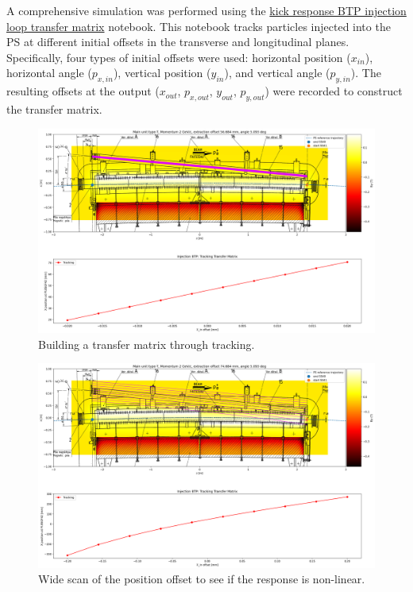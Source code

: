 A comprehensive simulation was performed using the  \href{https://gitlab.cern.ch/eljohnso/acc-models-tls-eliott-fork/-/blob/EliottBranch/ps_injection/kick_response_injection_tracking/kick_response_BTP_injection_loop_transfer_matrix.ipynb}{kick response BTP injection loop transfer matrix} notebook. This notebook tracks particles injected into the PS at different initial offsets in the transverse and longitudinal planes. Specifically, four types of initial offsets were used: horizontal position (\(x_{in}\)), horizontal angle (\(p_{x,in}\)), vertical position (\(y_{in}\)), and vertical angle (\(p_{y,in}\)). The resulting offsets at the output (\(x_{out}\), \(p_{x,out}\), \(y_{out}\), \(p_{y,out}\)) were recorded to construct the transfer matrix.

\begin{figure}[H]
\centering
\includegraphics[width=1.0\textwidth]{02_Simulation/images/injection_transfer_matrix_1.png}
\caption{Building a transfer matrix through tracking.}
\label{fig:transfer_matrix_1}
\end{figure}

\begin{figure}[H]
\centering
\includegraphics[width=1.0\textwidth]{02_Simulation/images/injection_transfer_matrix_2.png}
\caption{Wide scan of the position offset to see if the response is non-linear.}
\label{fig:transfer_matrix_2}
\end{figure}


